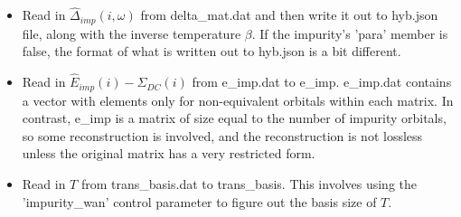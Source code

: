 \documentclass[aps,prb,singlecolumn,preprintnumbers,amsmath,amssymb]{revtex4}
\begin{document}
\begin{itemize}
\item Read in $\hat{\Delta}_{imp}(i,\omega)$ from delta\_mat.dat and then write it out to hyb.json file, along with  the inverse temperature $\beta$.     If the impurity's 'para' member is false, the format of what is written out to hyb.json is a bit different. 

\item Read in $\hat{E}_{imp}(i)- \Sigma_{DC}(i)$ from e\_imp.dat to e\_imp.  e\_imp.dat contains  a vector with elements only for non-equivalent orbitals within each matrix.  In contrast, e\_imp is a matrix of size equal to the number of impurity orbitals, so some reconstruction is involved, and the reconstruction is not lossless unless the original matrix has a very restricted form.


\item Read in $T$ from  trans\_basis.dat to trans\_basis. This involves using the 'impurity\_wan' control parameter to figure out the basis size of $T$.


\end{itemize}
\end{document}
